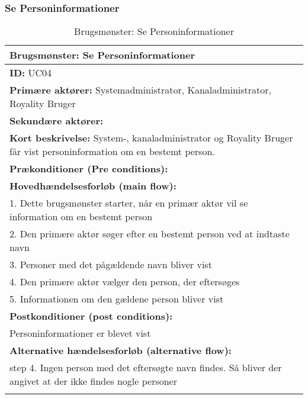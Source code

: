 \subsubsection{Se Personinformationer}
\begin{longtable}[h]{|p{16cm}|}
    \hline
    \textbf{Brugsmønster:}  Se Personinformationer \\ 
    \hline
	\textbf{ID:} UC04 \\ 
	\hline
	\textbf{Primære aktører:} Systemadministrator, Kanaladministrator, Royality Bruger \\ \hline
	\textbf{Sekundære aktører:} \\ \hline
	\textbf{Kort beskrivelse:} System-, kanaladministrator og Royality Bruger får vist personinformation om en bestemt person. \\ \hline
	\textbf{Prækonditioner (Pre conditions):} \\ \hline
\textbf{Hovedhændelsesforløb (main flow):} \\
1. Dette brugsmønster starter, når en primær aktør vil se information om en bestemt person \\ 
2. Den primære aktør søger efter en bestemt person ved at indtaste navn \\ 
3. Personer med det pågældende navn bliver vist \\ 
4. Den primære aktør vælger den person, der eftersøges \\
5. Informationen om den gældene person bliver vist \\ \hline
    \textbf{Postkonditioner (post conditions):} \\
    Personinformationer er blevet vist \\ \hline

	\textbf{Alternative hændelsesforløb (alternative flow):} \\
step 4. Ingen person med det eftersøgte navn findes. Så bliver der angivet at der ikke findes nogle personer\\ \hline
\caption{Brugsmønster: Se Personinformationer}
\label{table:read_personinfo}
\end{longtable}



